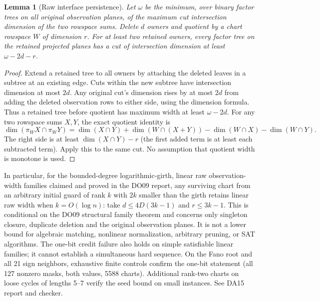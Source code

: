 \documentclass[11pt]{article}
\newtheorem{lemma}[theorem]{Lemma}
\begin{document}
\begin{lemma}[Raw interface persistence]\label{lem:da15-width}
Let $\omega$ be the minimum, over binary factor trees on all original observation planes, of the maximum cut intersection dimension of the two rowspace sums. Delete $d$ owners and quotient by a chart rowspace $W$ of dimension $r$. For at least two retained owners, every factor tree on the retained projected planes has a cut of intersection dimension at least $\omega-2d-r$.
\end{lemma}
\begin{proof}
Extend a retained tree to all owners by attaching the deleted leaves in a subtree at an existing edge. Cuts within the new subtree have intersection dimension at most $2d$. Any original cut's dimension rises by at most $2d$ from adding the deleted observation rows to either side, using the dimension formula. Thus a retained tree before quotient has maximum width at least $\omega-2d$. For any two rowspace sums $X,Y$, the exact quotient identity is
\[
 \dim(\pi_W X\cap\pi_W Y)=\dim(X\cap Y)+\dim(W\cap(X+Y))-\dim(W\cap X)-\dim(W\cap Y).
\]
The right side is at least $\dim(X\cap Y)-r$ (the first added term is at least each subtracted term). Apply this to the same cut. No assumption that quotient width is monotone is used.
\end{proof}
In particular, for the bounded-degree logarithmic-girth, linear raw observation-width families claimed and proved in the DO09 report, any surviving chart from an arbitrary initial guard of rank $k$ with $2k$ smaller than the girth retains linear raw width when $k=O(\log n)$: take $d\le4D(3k-1)$ and $r\le3k-1$. This is conditional on the DO09 structural family theorem and concerns only singleton closure, duplicate deletion and the original observation planes. It is not a lower bound for algebraic matching, nonlinear normalization, arbitrary pruning, or SAT algorithms. The one-bit credit failure also holds on simple satisfiable linear families; it cannot establish a simultaneous hard sequence. On the Fano root and all 21 sign neighbors, exhaustive finite controls confirm the one-bit statement (all 127 nonzero masks, both values, 5588 charts). Additional rank-two charts on loose cycles of lengths 5--7 verify the seed bound on small instances. See DA15 report and checker.
\end{document}

